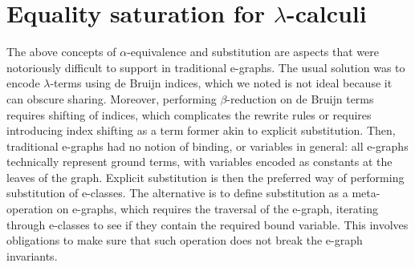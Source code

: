 \section{Equality saturation for $\lambda$-calculi}

The above concepts of $\alpha$-equivalence and substitution are aspects that were notoriously difficult to support in traditional e-graphs.
The usual solution was to encode $\lambda$-terms using de Bruijn indices, which we noted is not ideal because it can obscure sharing.
Moreover, performing $\beta$-reduction on de Bruijn terms requires shifting of indices, which complicates the rewrite rules or requires introducing index shifting as a term former akin to explicit substitution.
Then, traditional e-graphs had no notion of binding, or variables in general: all e-graphs technically represent ground terms, with variables encoded as constants at the leaves of the graph.
Explicit substitution is then the preferred way of performing substitution of e-classes.
The alternative is to define substitution as a meta-operation on e-graphs, which requires the traversal of the e-graph, iterating through e-classes to see if they contain the required bound variable.
This involves obligations to make sure that such operation does not break the e-graph invariants.

